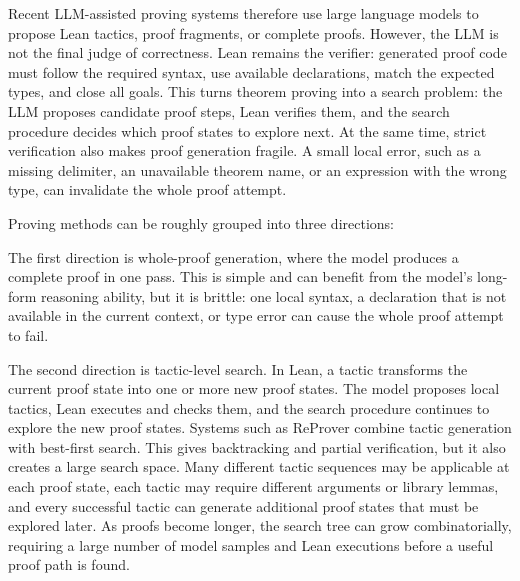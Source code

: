 \documentclass[en]{uet_awesome_thesis/uet-awesome-thesis}
\begin{document}
Recent LLM-assisted proving systems therefore use large language models to propose Lean tactics, proof fragments, or complete proofs. 
However, the LLM is not the final judge of correctness. Lean remains the verifier: generated proof code must follow the required syntax, use available declarations, match the expected types, and close all goals.
This turns theorem proving into a search problem: the LLM proposes candidate proof steps, Lean verifies them, and the search procedure decides which proof states to explore next. 
At the same time, strict verification also makes proof generation fragile. A small local error, such as a missing delimiter, an unavailable theorem name, or an expression with the wrong type, can invalidate the whole proof attempt.

Proving methods can be roughly grouped into three directions: 

The first direction is whole-proof generation, where the model produces a complete proof in one pass. This is simple and can benefit from the model's long-form reasoning ability, but it is brittle: one local syntax, a declaration that is not available in the current context, or type error can cause the whole proof attempt to fail.

The second direction is tactic-level search. In Lean, a tactic transforms the current proof state into one or more new proof states. The model proposes local tactics, Lean executes and checks them, and the search procedure continues to explore the new proof states. Systems such as ReProver \cite{yang2023leandojo} combine tactic generation with best-first search. This gives backtracking and partial verification, but it also creates a large search space. Many different tactic sequences may be applicable at each proof state, each tactic may require different arguments or library lemmas, and every successful tactic can generate additional proof states that must be explored later. As proofs become longer, the search tree can grow combinatorially, requiring a large number of model samples and Lean executions before a useful proof path is found.
\end{document}
